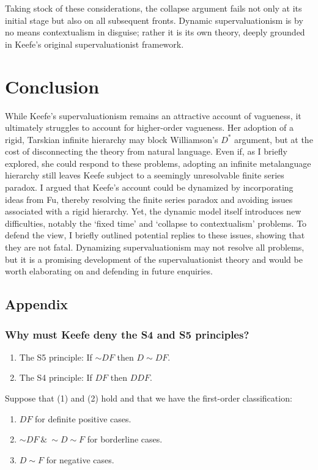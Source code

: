 Taking stock of these considerations, the collapse argument fails not
only at its initial stage but also on all subsequent fronts. Dynamic
supervaluationism is by no means contextualism in disguise; rather it is
its own theory, deeply grounded in Keefe's original supervaluationist
framework.

\section{Conclusion}

While Keefe's supervaluationism remains an attractive account of
vagueness, it ultimately struggles to account for higher-order
vagueness. Her adoption of a rigid, Tarskian infinite hierarchy may
block Williamson's $D^*$ argument, but at the cost of disconnecting the
theory from natural language. Even if, as I briefly explored, she could
respond to these problems, adopting an infinite metalanguage hierarchy
still leaves Keefe subject to a seemingly unresolvable finite series
paradox. I argued that Keefe's account could be dynamized by
incorporating ideas from Fu, thereby resolving the finite series paradox
and avoiding issues associated with a rigid hierarchy. Yet, the dynamic
model itself introduces new difficulties, notably the `fixed time' and
`collapse to contextualism' problems. To defend the view, I briefly
outlined potential replies to these issues, showing that they are not
fatal. Dynamizing supervaluationism may not resolve all problems, but it
is a promising development of the supervaluationist theory and would be
worth elaborating on and defending in future enquiries.

\subsection*{Appendix}

\subsubsection*{Why must Keefe deny the S4 and S5 principles?}

\begin{enumerate}
\def\labelenumi{(\arabic{enumi})}
\item The S5 principle: If ${\sim}DF$ then $D{\sim}DF$.
\item The S4 principle: If $DF$ then $DDF$. 
\end{enumerate}
Suppose that (1) and (2) hold and that we have the first-order
classification:
\begin{enumerate}
  \def\labelenumi{(\roman{enumi})}
\item{$DF$ for definite positive cases.}
\item{${\sim}DF \ \& \ {\sim}D{\sim}F$ for borderline cases.}
  \item{$D{\sim}F$ for negative cases.}
  \end{enumerate}

